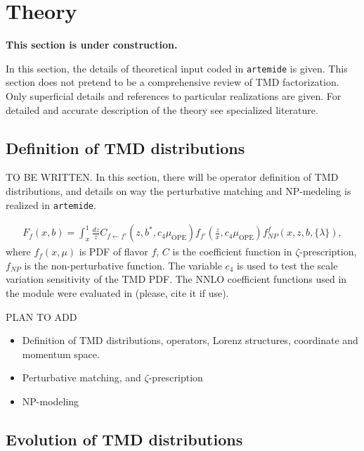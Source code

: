 \documentclass[prd,nofootinbib,eqsecnum,final]{revtex4}
\newcommand{\ot}{\leftarrow}
\renewcommand{\(}{\left(}
\renewcommand{\)}{\right)}
\renewcommand{\[}{\left[}
\renewcommand{\]}{\right]}
\newcommand{\red}[1]{{\color[rgb]{1,0,0} #1}}
\begin{document}
\newpage

\section{Theory}

\begin{center}
\red{\textbf{This section is under construction.}}
\end{center}

In this section, the details of theoretical input coded in \texttt{artemide} is given. This section does not pretend to be a comprehensive review of TMD factorization. Only superficial details and references to particular realizations are given. For detailed and accurate description of the theory see specialized literature.

\subsection{Definition of TMD distributions}

\red{TO BE WRITTEN}. In this section, there will be operator definition of TMD distributions, and details on way the perturbative matching and NP-medeling is realized in \texttt{artemide}.

\begin{eqnarray}
F_f(x,b)=\int_x^1 \frac{dz}{z}C_{f\ot f'}(z,b^*,c_4\mu_\text{OPE})f_{f'}(\frac{z}{x},c_4\mu_\text{OPE})f^f_{NP}(x,z,b,\{\lambda\}),
\end{eqnarray}
where $f_f(x,\mu)$ is PDF of flavor $f$, $C$ is the coefficient function in $\zeta$-prescription, $f_{NP}$ is the non-perturbative function. The variable $c_4$ is used to test the scale variation sensitivity of the TMD PDF. The NNLO coefficient functions used in the module were evaluated in \cite{Echevarria:2016scs} (please, cite it if use).


\red{PLAN TO ADD}
\begin{itemize}
\item Definition of TMD distributions, operators, Lorenz structures, coordinate and momentum space. 
\item Perturbative matching, and $\zeta$-prescription
\item NP-modeling
\end{itemize}


\subsection{Evolution of TMD distributions}
\end{document}
